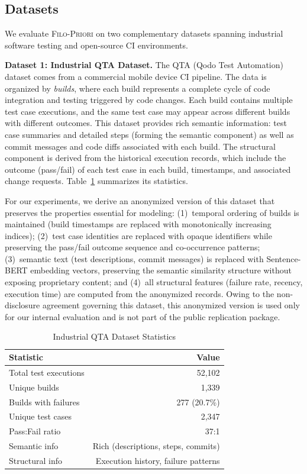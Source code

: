 \documentclass[10pt,journal,compsoc]{IEEEtran}
\newcommand{\filopriori}{\textsc{Filo-Priori}}
\begin{document}
\subsection{Datasets}

We evaluate \filopriori{} on two complementary datasets spanning industrial
software testing and open-source CI environments.

\textbf{Dataset 1: Industrial QTA Dataset.} The QTA (Qodo Test Automation) dataset
comes from a commercial mobile device CI pipeline. The data is organized by
\emph{builds}, where each build represents a complete cycle of code integration and
testing triggered by code changes. Each build contains multiple test case
executions, and the same test case may appear across different builds with
different outcomes. This dataset provides rich semantic information:
test case summaries and detailed steps (forming the semantic component) as well as
commit messages and code diffs associated with each build. The structural component
is derived from the historical execution records, which include the outcome
(pass/fail) of each test case in each build, timestamps, and associated change
requests. Table~\ref{tab:dataset_qta} summarizes its statistics.

For our experiments, we derive an anonymized version of this dataset that
preserves the properties essential for modeling: (1)~temporal ordering of
builds is maintained (build timestamps are replaced with monotonically
increasing indices); (2)~test case identities are replaced with opaque
identifiers while preserving the pass/fail outcome sequence and co-occurrence
patterns; (3)~semantic text (test descriptions, commit messages) is replaced
with Sentence-BERT embedding vectors, preserving the semantic similarity
structure without exposing proprietary content; and (4)~all structural
features (failure rate, recency, execution time) are computed from the
anonymized records. Owing to the non-disclosure agreement governing this
dataset, this anonymized version is used only for our internal evaluation and
is not part of the public replication package.

\begin{table}[!t]
\centering
\caption{Industrial QTA Dataset Statistics}
\label{tab:dataset_qta}
\begin{tabular}{lr}
\toprule
\textbf{Statistic} & \textbf{Value} \\
\midrule
Total test executions & 52,102 \\
Unique builds & 1,339 \\
Builds with failures & 277 (20.7\%) \\
Unique test cases & 2,347 \\
Pass:Fail ratio & 37:1 \\
Semantic info & Rich (descriptions, steps, commits) \\
Structural info & Execution history, failure patterns \\
\bottomrule
\end{tabular}
\end{table}
\end{document}
